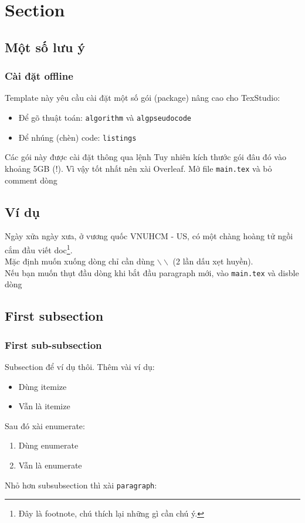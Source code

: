\documentclass[a4paper,14pt]{article}
\begin{document}
\tableofcontents
\pagebreak
\listoftables
\pagebreak
\listoffigures
\pagebreak

	\section{Section}
	\subsection{Một số lưu ý}
	\subsubsection{Cài đặt offline}
	Template này yêu cầu cài đặt một số gói (package) nâng cao cho TexStudio:
	\begin{itemize}
		\item Để gõ thuật toán: \texttt{algorithm} và \texttt{algpseudocode}
		\item Để nhúng (chèn) code: \texttt{listings}
	\end{itemize}
	Các gói này được cài đặt thông qua lệnh
	Tuy nhiên kích thước gói đâu đó vào khoảng 5GB (!). Vì vậy tốt nhất nên xài Overleaf.
	Mở file \texttt{main.tex} và bỏ comment dòng 
	\subsection{Ví dụ}
	Ngày xửa ngày xưa, ở vương quốc VNUHCM - US, có một chàng hoàng tử ngồi cắm đầu viết doc\footnote{Đây là footnote, chú thích lại những gì cần chú ý.}.\\
	Mặc định muốn xuống dòng chỉ cần dùng $\backslash\backslash$  (2 lần dấu xẹt huyền).\\
	Nếu bạn muốn thụt đầu dòng khi bắt đầu paragraph mới, vào \texttt{main.tex} và disble dòng
	\subsection{First subsection}
	\subsubsection{First sub-subsection}
	Subsection để ví dụ thôi. Thêm vài ví dụ:
	\begin{itemize}
		\item Dùng itemize
		\item Vẫn là itemize
	\end{itemize}
	Sau đó xài enumerate:
	\begin{enumerate}
		\item Dùng enumerate
		\item Vẫn là enumerate
	\end{enumerate}
	Nhỏ hơn subsubsection thì xài \texttt{paragraph}:
\end{document}
